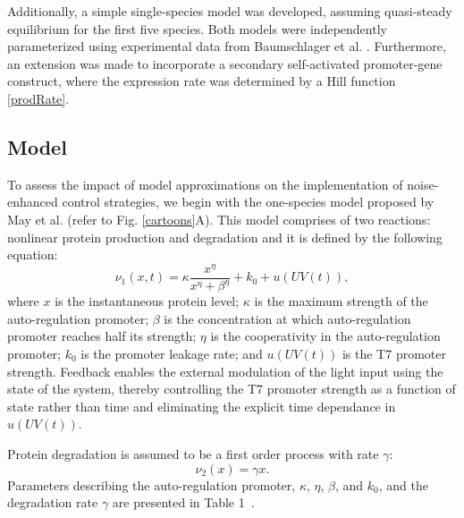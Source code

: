 \documentclass[12pt]{article}
\begin{document}
Additionally, a simple single-species model was developed, assuming quasi-steady equilibrium for the first five species. Both models were independently parameterized using experimental data from Baumschlager et al. \cite{XXX}. Furthermore, an extension was made to incorporate a secondary self-activated promoter-gene construct, where the expression rate was determined by a Hill function \ref{prodRate}.

\subsection{Model}
To assess the impact of model approximations on the implementation of noise-enhanced control strategies, we begin with the one-species model proposed by May et al. \cite{May2021} (refer to Fig. \ref{cartoons}A). This model comprises of two reactions: nonlinear protein production and degradation and it is defined by the following equation:
 \begin{equation}
\nu_1(x,t)= \kappa\frac{x^\eta}{x^\eta+\beta^\eta}+ k_0 + u(UV(t)),
\label{prodRate}
\end{equation}
%
%
where $x$ is the instantaneous protein level; $\kappa$ is the maximum strength of the auto-regulation promoter; $\beta$ is the concentration at which auto-regulation promoter reaches half its strength; $\eta$ is the cooperativity in the auto-regulation promoter; $k_0$ is the promoter leakage rate; and $u(UV(t))$ is the T7 promoter strength. 
Feedback enables the external modulation of the light input using the state of the system, thereby controlling the T7 promoter strength as a function of state rather than time and eliminating the explicit time dependance in $u(UV(t))$.

Protein degradation is assumed to be a first order process with rate $\gamma$:
\begin{equation}
\nu_2(x) = \gamma x.
\end{equation}
Parameters describing the auto-regulation promoter, $\kappa$, $\eta$, $\beta$, and $k_0$, and the degradation rate $\gamma$
are presented in Table 1~\cite{May2021}. 
\end{document}
